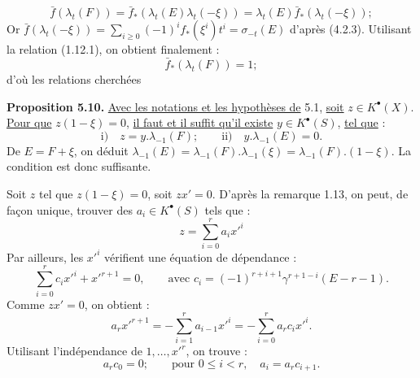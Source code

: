 
\[
  \bar f(\lambda_t(F))=
  \bar f_*(\lambda_t(E)\lambda_t(-\xi))=
  \lambda_t(E)\bar f_*(\lambda_t(-\xi));
\]
Or $\bar f(\lambda_t(-\xi))=\sum_{i\ge0}(-1)^if_*(\xi^i)t^i=\sigma_{-t}(E)$ d'après (4.2.3).
Utilisant la relation (1.12.1), on obtient finalement :
\[
  \bar f_*(\lambda_t(F))=1;
\]
d'où les relations cherchées

\textbf{Proposition 5.10.} \uline{Avec les notations et les hypothèses de} 5.1, \uline{soit} $z\in K^{\bullet}(X)$. \uline{Pour que} $z(1-\xi)=0$, \uline{il faut et il suffit qu'il existe} $y\in K^{\bullet}(S)$, \uline{tel que} :
\[
  \text{i)}\quad z=y.\lambda_{-1}(F);
  \qquad
  \text{ii)}\quad y.\lambda_{-1}(E)=0.
\]
De $E=F+\xi$, on déduit $\lambda_{-1}(E)=\lambda_{-1}(F).\lambda_{-1}(\xi)=\lambda_{-1}(F).(1-\xi)$. La condition est donc suffisante.

Soit $z$ tel que $z(1-\xi)=0$, soit $zx'=0$. D'après la remarque 1.13, on peut, de façon unique, trouver des $a_i\in K^{\bullet}(S)$ tels que :
\[
  z=\sum_{i=0}^{r}a_i{x'}^i
\]
Par ailleurs, les ${x'}^i$ vérifient une équation de dépendance :
\[
  \sum_{i=0}^{r}c_i{x'}^i+{x'}^{r+1}=0,
  \qquad \text{avec } c_i=(-1)^{r+i+1}\gamma^{r+1-i}(E-r-1).
\]
Comme $zx'=0$, on obtient :
\[
  a_r{x'}^{r+1}=-\sum_{i=1}^{r}a_{i-1}{x'}^i
  =-\sum_{i=0}^{r}a_rc_i{x'}^i .
\]
Utilisant l'indépendance de $1,\ldots,{x'}^r$, on trouve :
\[
  a_rc_0=0;
  \qquad \text{pour } 0\le i<r,
  \quad a_i=a_rc_{i+1}.
\]
